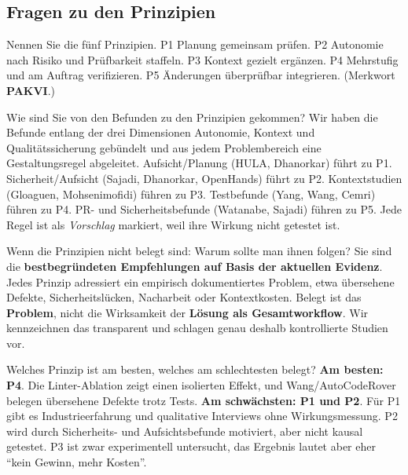\documentclass[12pt,a4paper]{article}
\begin{document}
\subsection{Fragen zu den Prinzipien}

\begin{qa}{Nennen Sie die fünf Prinzipien.}
P1 Planung gemeinsam prüfen. P2 Autonomie nach Risiko und Prüfbarkeit staffeln. P3 Kontext gezielt ergänzen. P4 Mehrstufig und am Auftrag verifizieren. P5 Änderungen überprüfbar integrieren. (Merkwort \textbf{PAKVI}.)
\end{qa}

\begin{qa}{Wie sind Sie von den Befunden zu den Prinzipien gekommen?}
Wir haben die Befunde entlang der drei Dimensionen Autonomie, Kontext und Qualitätssicherung gebündelt und aus jedem Problembereich eine Gestaltungsregel abgeleitet. Aufsicht/Planung (HULA, Dhanorkar) führt zu P1. Sicherheit/Aufsicht (Sajadi, Dhanorkar, OpenHands) führt zu P2. Kontextstudien (Gloaguen, Mohsenimofidi) führen zu P3. Testbefunde (Yang, Wang, Cemri) führen zu P4. PR- und Sicherheitsbefunde (Watanabe, Sajadi) führen zu P5. Jede Regel ist als \emph{Vorschlag} markiert, weil ihre Wirkung nicht getestet ist.
\end{qa}

\begin{qa}{Wenn die Prinzipien nicht belegt sind: Warum sollte man ihnen folgen?}
Sie sind die \textbf{bestbegründeten Empfehlungen auf Basis der aktuellen Evidenz}. Jedes Prinzip adressiert ein empirisch dokumentiertes Problem, etwa übersehene Defekte, Sicherheitslücken, Nacharbeit oder Kontextkosten. Belegt ist das \textbf{Problem}, nicht die Wirksamkeit der \textbf{Lösung als Gesamtworkflow}. Wir kennzeichnen das transparent und schlagen genau deshalb kontrollierte Studien vor.
\end{qa}

\begin{qa}{Welches Prinzip ist am besten, welches am schlechtesten belegt?}
\textbf{Am besten: P4}. Die Linter-Ablation zeigt einen isolierten Effekt, und Wang/AutoCodeRover belegen übersehene Defekte trotz Tests. \textbf{Am schwächsten: P1 und P2}. Für P1 gibt es Industrieerfahrung und qualitative Interviews ohne Wirkungsmessung. P2 wird durch Sicherheits- und Aufsichtsbefunde motiviert, aber nicht kausal getestet. P3 ist zwar experimentell untersucht, das Ergebnis lautet aber eher \enquote{kein Gewinn, mehr Kosten}.
\end{qa}
\end{document}
